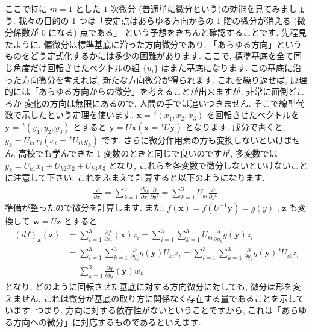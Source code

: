 \documentclass[openany, a4paper, oneside]{jsbook}
\theoremstyle{break}
\theoremstyle{breakdefn}
\begin{document}
ここで特に $m=1$ とした $1$ 次微分 (普通単に微分という)の効能を見てみましょう.
我々の目的の 1 つは「安定点はあらゆる方向からの 1 階の微分が消える (微分係数が 0 になる) 点である」
という予想をきちんと確認することです.
先程見たように, 偏微分は標準基底に沿った方向微分であり, 「あらゆる方向」というものをどう定式化するかには多少の困難があります.
ここで, 標準基底を全て同じ角度だけ回転させたベクトルの組 $\{u_i\}$ はまた基底になります.
この基底に沿った方向微分を考えれば, 新たな方向微分が得られます.
これを繰り返せば, 原理的には「あらゆる方向からの微分」を考えることが出来ますが, 非常に面倒どころか
変化の方向は無限にあるので, 人間の手では追いつきません.
そこで線型代数で示したという定理を使います.
 $\bm{x}=\,^t (x_1,x_2,x_3)$ を回転させたベクトルを $\bm{y}=\,^t (y_1,y_2,y_3)$ とすると
 $\bm{y}=U\bm{x}(\bm{x}=\,^t U\bm{y})$ となります. 成分で書くと,  $y_k=U_{k i}x_i (x_i=\,^t U_{i k}y_k)$ です.
さらに微分作用素の方も変換しないといけません.
高校でも学んできた 1 変数のときと同じで良いのですが,
多変数では $y_k=U_{k1}x_1+U_{k2}x_2+U_{k3}x_3$ となり,
これらを各変数で微分しないといけないことに注意して下さい.
これをふまえて計算すると以下のようになります.
    \begin{align}
        \frac{\partial } {\partial x_i}
        =
        \sum_{k=1}^3 \frac{\partial y_k } {\partial x_i} \frac{\partial } {\partial y^k}
        =
        \sum_{k=1}^3 U_{k i} \frac{\partial } {\partial y^k}.
    \end{align}
準備が整ったので微分を計算します.
また,  $f (\bm{x})=f (U^{-1}\bm{y})=g (y)$ ,  $\bm{z}$ も変換して $\bm{w}=U\bm{z}$ とすると
    \begin{align}
        (df)_{\bm{x}}(\bm{z})
        &=
        \sum_{i=1}^3 \frac{\partial f } {\partial x_i }(\bm{x}) z_i
        =
        \sum_{i=1}^3 \sum_{k=1}^{3}     U_{k i} \frac{\partial } {\partial y_k}g (\bm{y}) z_i\\
        &=
        \sum_{i=1}^3 \sum_{k=1}^{3} \frac{\partial } {\partial y_k} g (\bm{y}) U_{k i} z_i
        =
        \sum_{i=1}^3 \sum_{k=1}^{3} \frac{\partial } {\partial y_k} g (\bm{y}) \,^t U_{i k} z_i\\
        &=
        \sum_{k=1}^{3} \frac{\partial g} {\partial y_k} (\bm{y}) w_k
    \end{align}
となり, どのように回転させた基底に対する方向微分に対しても, 微分は形を変えません.
これは微分が基底の取り方に関係なく存在する量であることを示しています.
つまり, 方向に対する依存性がないということですから, これは「あらゆる方向への微分」に対応するものであるといえます.
\end{document}

